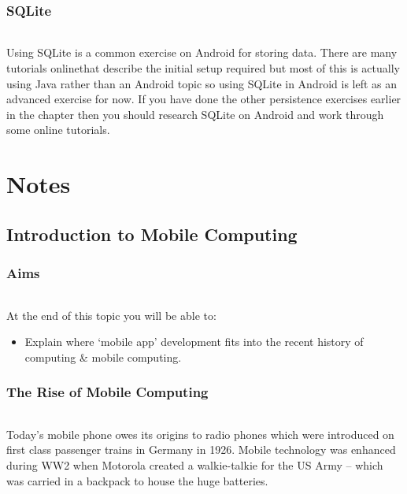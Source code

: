 \documentclass[12pt, a4paper, twoside]{book}
\begin{document}
\section{SQLite}
\paragraph{} Using SQLite is a common exercise on Android for storing data. There are many tutorials onlinethat describe the initial setup required but most of this is actually using Java rather than an Android topic so using SQLite in Android is left as an advanced exercise for now. If you have done the other persistence exercises earlier in the chapter then you should research SQLite on Android and work through some online tutorials.





\part{Notes}
\chapter{Introduction to Mobile Computing} 

\section{Aims}
\paragraph{} At the end of this topic you will be able to:

\begin{itemize}
\item Explain where ‘mobile app’ development fits into the recent history of computing \& mobile computing. 
\end{itemize}


\section{The Rise of Mobile Computing}
\paragraph{} Today's mobile phone owes its origins to radio phones which were introduced on first class passenger trains in Germany in 1926. Mobile technology was enhanced during WW2 when Motorola created a walkie-talkie for the US Army – which was carried in a backpack to house the huge batteries.
\end{document}
